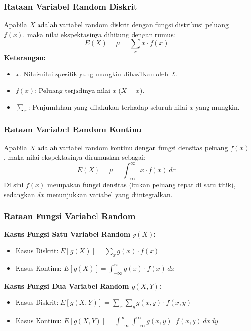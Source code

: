 \documentclass[12pt, a4paper]{article}
\begin{document}
\subsubsection{Rataan Variabel Random Diskrit}
Apabila $X$ adalah variabel random diskrit dengan fungsi distribusi peluang $f(x)$, maka nilai ekspektasinya dihitung dengan rumus:
$$E(X) = \mu = \sum_{x} x \cdot f(x)$$
\textbf{Keterangan:}
\begin{itemize}
    \item $x$: Nilai-nilai spesifik yang mungkin dihasilkan oleh $X$.
    \item $f(x)$: Peluang terjadinya nilai $x$ ($X = x$).
    \item $\sum_{x}$: Penjumlahan yang dilakukan terhadap seluruh nilai $x$ yang mungkin.
\end{itemize}

\subsubsection{Rataan Variabel Random Kontinu}
Apabila $X$ adalah variabel random kontinu dengan fungsi densitas peluang $f(x)$, maka nilai ekspektasinya dirumuskan sebagai:
$$E(X) = \mu = \int_{-\infty}^{\infty} x \cdot f(x) \, dx$$
Di sini $f(x)$ merupakan fungsi densitas (bukan peluang tepat di satu titik), sedangkan $dx$ menunjukkan variabel yang diintegralkan.

\subsubsection{Rataan Fungsi Variabel Random}
\textbf{Kasus Fungsi Satu Variabel Random $g(X)$:} \\
\begin{itemize}
    \item Kasus Diskrit: $E[g(X)] = \sum_{x} g(x) \cdot f(x)$
    \item Kasus Kontinu: $E[g(X)] = \int_{-\infty}^{\infty} g(x) \cdot f(x) \, dx$
\end{itemize}

\textbf{Kasus Fungsi Dua Variabel Random $g(X, Y)$:} \\
\begin{itemize}
    \item Kasus Diskrit: $E[g(X, Y)] = \sum_{x} \sum_{y} g(x, y) \cdot f(x, y)$
    \item Kasus Kontinu: $E[g(X, Y)] = \int_{-\infty}^{\infty} \int_{-\infty}^{\infty} g(x, y) \cdot f(x, y) \, dx \, dy$
\end{itemize}
\end{document}
